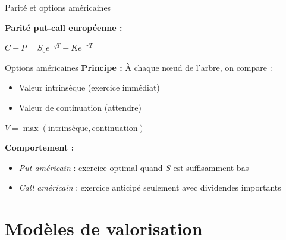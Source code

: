 \documentclass[aspectratio=169]{beamer}
\begin{document}
\begin{frame}{Parité et options américaines}
  \small
  
  \begin{formulabox}\scriptsize
    \textbf{Parité put-call européenne :}
    \vspace{1mm}
    
    $C - P = S_0e^{-qT} - Ke^{-rT}$
  \end{formulabox}
  
  \vspace{3mm}
  \begin{keybox}{Options américaines}
    \scriptsize
    \textbf{Principe :} À chaque nœud de l'arbre, on compare :
    \begin{itemize}\scriptsize
      \item Valeur intrinsèque (exercice immédiat)
      \item Valeur de continuation (attendre)
    \end{itemize}
    
    $V = \max(\text{intrinsèque}, \text{continuation})$
    
    \vspace{2mm}
    \textbf{Comportement :}
    \begin{itemize}\scriptsize
      \item \emph{Put américain} : exercice optimal quand $S$ est suffisamment bas
      \item \emph{Call américain} : exercice anticipé seulement avec dividendes importants
    \end{itemize}
  \end{keybox}
\end{frame}

\section{Modèles de valorisation}
\end{document}

